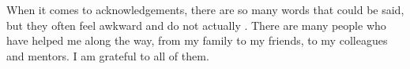 \begin{acknowledgements}
    When it comes to acknowledgements, there are so many words that could be said, but they often feel awkward and do not actually . There are many people who have helped me along the way, from my family to my friends, to my colleagues and mentors. I am grateful to all of them. 



\end{acknowledgements}

